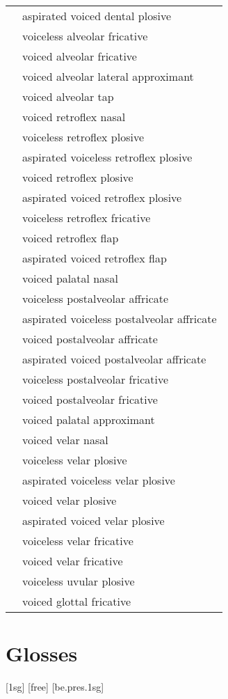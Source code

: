 \documentclass[12pt]{article}
\begin{document}
\begin{xltabular}{\textwidth}{lL}
   & aspirated voiced dental plosive \\
   & voiceless alveolar fricative \\
   & voiced alveolar fricative \\
   & voiced alveolar lateral approximant \\
   & voiced alveolar tap \\
   & voiced retroflex nasal \\
   & voiceless retroflex plosive \\
   & aspirated voiceless retroflex plosive \\
   & voiced retroflex plosive \\
   & aspirated voiced retroflex plosive \\
   & voiceless retroflex fricative \\
   & voiced retroflex flap \\
   & aspirated voiced retroflex flap \\
  \ipa{\textltailn} & voiced palatal nasal \\
  \ipa{\t{\textteshlig}} & voiceless postalveolar affricate \\
   & aspirated voiceless postalveolar affricate \\
  \ipa{\t{\textdyoghlig}} & voiced postalveolar affricate \\
   & aspirated voiced postalveolar affricate \\
   & voiceless postalveolar fricative \\
   & voiced postalveolar fricative \\
   & voiced palatal approximant \\
   & voiced velar nasal \\
   & voiceless velar plosive \\
   & aspirated voiceless velar plosive \\
   & voiced velar plosive \\
   & aspirated voiced velar plosive \\
   & voiceless velar fricative \\
   & voiced velar fricative \\
   & voiceless uvular plosive \\
   & voiced glottal fricative \\
\end{xltabular}

\newpage\section{Glosses}

\ex[lingstyle=custom_nlevel]
\begingl
{}[{\sc 1sg}]
[free]
[be.{\sc pres.1sg}]
\endgl
\xe
\end{document}
